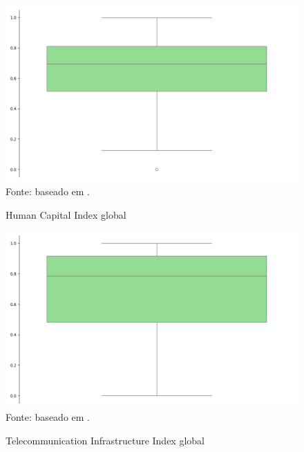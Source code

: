 \begin{figure}[H]
    \centering
    \caption{Human Capital Index global}
    \includegraphics[width=1\linewidth]{figuras/egdi/boxplot_hci_global.png}
    \label{fig:boxplot_hci_global}
    \footnotesize{Fonte: baseado em \cite{ONU_edgi_mapa}.}
\end{figure}

\begin{figure}[H]
    \centering
    \caption{Telecommunication Infrastructure Index global}
    \includegraphics[width=1\linewidth]{figuras/egdi/boxplot_tci_global.png}
    \label{fig:boxplot_tci_global}
    \footnotesize{Fonte: baseado em \cite{ONU_edgi_mapa}.}
\end{figure}

